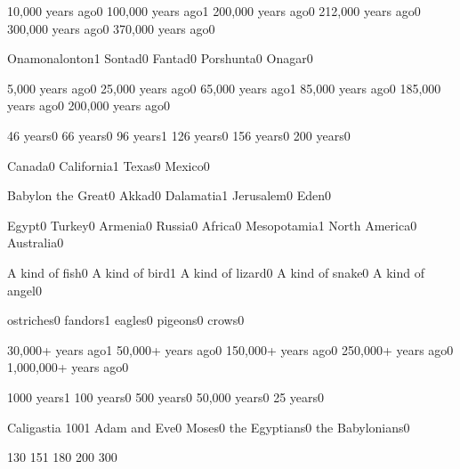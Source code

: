 {10,000 years ago}{0}
{100,000 years ago}{1}
{200,000 years ago}{0}
{212,000 years ago}{0}
{300,000 years ago}{0}
{370,000 years ago}{0}
\qstop

{Onamonalonton}{1}
{Sontad}{0}
{Fantad}{0}
{Porshunta}{0}
{Onagar}{0}
\qstop

{5,000 years ago}{0}
{25,000 years ago}{0}
{65,000 years ago}{1}
{85,000 years ago}{0}
{185,000 years ago}{0}
{200,000 years ago}{0}
\qstop

{46 years}{0}
{66 years}{0}
{96 years}{1}
{126 years}{0}
{156 years}{0}
{200 years}{0}
\qstop

{Canada}{0}
{California}{1}
{Texas}{0}
{Mexico}{0}
\qstop



{Babylon the Great}{0}
{Akkad}{0}
{Dalamatia}{1}
{Jerusalem}{0}
{Eden}{0}
\qstop

{Egypt}{0}
{Turkey}{0}
{Armenia}{0}
{Russia}{0}
{Africa}{0}
{Mesopotamia}{1}
{North America}{0}
{Australia}{0}
\qstop

{A kind of fish}{0}
{A kind of bird}{1}
{A kind of lizard}{0}
{A kind of snake}{0}
{A kind of angel}{0}
\qstop

{ostriches}{0}
{fandors}{1}
{eagles}{0}
{pigeons}{0}
{crows}{0}
\qstop

{30,000+ years ago}{1}
{50,000+ years ago}{0}
{150,000+ years ago}{0}
{250,000+ years ago}{0}
{1,000,000+ years ago}{0}
\qstop

{1000 years}{1}
{100 years}{0}
{500 years}{0}
{50,000 years}{0}
{25 years}{0}
\qstop

{Caligastia 100}{1}
{Adam and Eve}{0}
{Moses}{0}
{the Egyptians}{0}
{the Babylonians}{0}
\qstop

{13}{0}
{15}{1}
{18}{0}
{20}{0}
{30}{0}
\qstop

